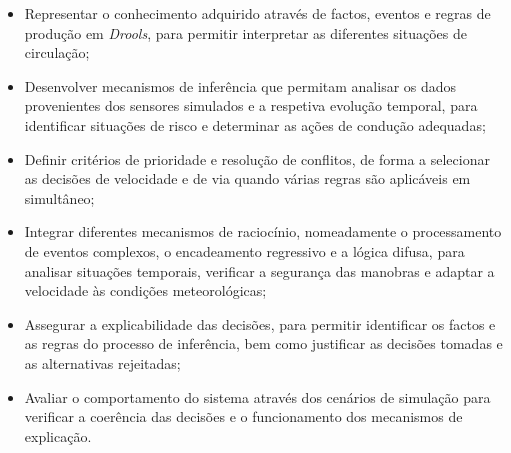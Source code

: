 \begin{itemize}
  \item Representar o conhecimento adquirido através de factos, eventos e regras de produção em \emph{Drools}, para permitir interpretar as diferentes situações de circulação;
  \item Desenvolver mecanismos de inferência que permitam analisar os dados provenientes dos sensores simulados e a respetiva evolução temporal, para identificar situações de risco e determinar as ações de condução adequadas;
  \item Definir critérios de prioridade e resolução de conflitos, de forma a selecionar as decisões de velocidade e de via quando várias regras são aplicáveis em simultâneo;
  \item Integrar diferentes mecanismos de raciocínio, nomeadamente o processamento de eventos complexos, o encadeamento regressivo e a lógica difusa, para analisar situações temporais, verificar a segurança das manobras e adaptar a velocidade às condições meteorológicas;
  \item Assegurar a explicabilidade das decisões, para permitir identificar os factos e as regras do processo de inferência, bem como justificar as decisões tomadas e as alternativas rejeitadas;
  \item Avaliar o comportamento do sistema através dos cenários de simulação para verificar a coerência das decisões e o funcionamento dos mecanismos de explicação.
\end{itemize}
